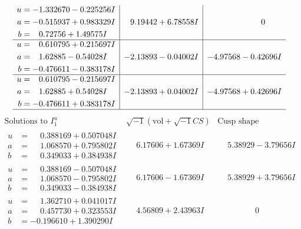 \documentclass[1p]{elsarticle_modified}
\theoremstyle{definition}
\newcommand{\I}{\sqrt{-1}}
\begin{document}
$$\begin{array}{c|c|c}
\begin{aligned}
u &= -1.332670 - 0.225256 I \\
a &= -0.515937 + 0.983329 I \\
b &= \phantom{-}0.72756 + 1.49575 I\end{aligned}
 & \phantom{-}9.19442 + 6.78558 I & \phantom{-0.000000 } 0 \\ \hline\begin{aligned}
u &= \phantom{-}0.610795 + 0.215697 I \\
a &= \phantom{-}1.62885 - 0.54028 I \\
b &= -0.476611 - 0.383178 I\end{aligned}
 & -2.13893 - 0.04002 I & -4.97568 - 0.42696 I \\ \hline\begin{aligned}
u &= \phantom{-}0.610795 - 0.215697 I \\
a &= \phantom{-}1.62885 + 0.54028 I \\
b &= -0.476611 + 0.383178 I\end{aligned}
 & -2.13893 + 0.04002 I & -4.97568 + 0.42696 I\\
 \hline 
 \end{array}$$\newpage$$\begin{array}{c|c|c}  
\text{Solutions to }I^u_{1}& \I (\text{vol} + \sqrt{-1}CS) & \text{Cusp shape}\\
 \hline 
\begin{aligned}
u &= \phantom{-}0.388169 + 0.507048 I \\
a &= \phantom{-}1.068570 + 0.795802 I \\
b &= \phantom{-}0.349033 + 0.384938 I\end{aligned}
 & \phantom{-}6.17606 + 1.67369 I & \phantom{-}5.38929 - 3.79656 I \\ \hline\begin{aligned}
u &= \phantom{-}0.388169 - 0.507048 I \\
a &= \phantom{-}1.068570 - 0.795802 I \\
b &= \phantom{-}0.349033 - 0.384938 I\end{aligned}
 & \phantom{-}6.17606 - 1.67369 I & \phantom{-}5.38929 + 3.79656 I \\ \hline\begin{aligned}
u &= \phantom{-}1.362710 + 0.041017 I \\
a &= \phantom{-}0.457730 + 0.323553 I \\
b &= -0.196610 + 1.390290 I\end{aligned}
 & \phantom{-}4.56809 + 2.43963 I & \phantom{-0.000000 } 0 \\ \hline\begin{aligned}

\end{aligned}
\end{array}$$
\end{document}
